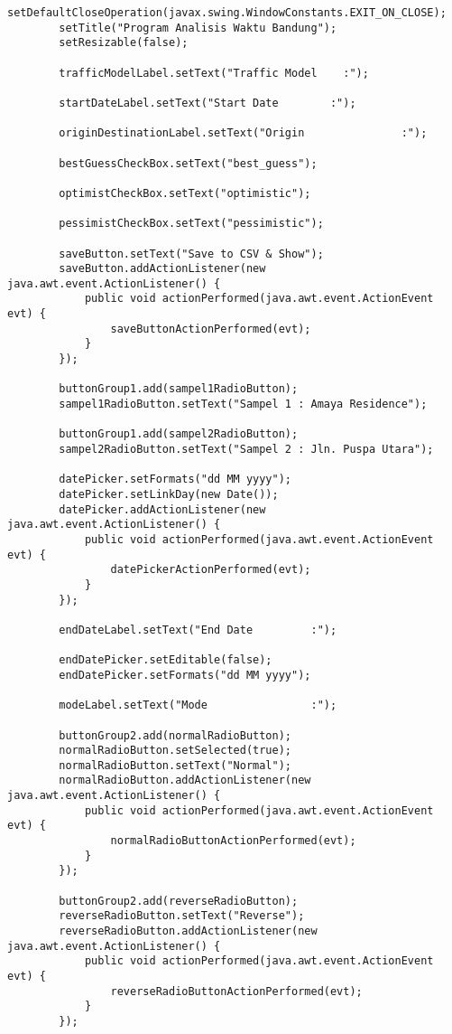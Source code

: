 \begin{lstlisting}[caption= main.java]
        setDefaultCloseOperation(javax.swing.WindowConstants.EXIT_ON_CLOSE);
        setTitle("Program Analisis Waktu Bandung");
        setResizable(false);

        trafficModelLabel.setText("Traffic Model    :");

        startDateLabel.setText("Start Date        :");

        originDestinationLabel.setText("Origin               :");

        bestGuessCheckBox.setText("best_guess");

        optimistCheckBox.setText("optimistic");

        pessimistCheckBox.setText("pessimistic");

        saveButton.setText("Save to CSV & Show");
        saveButton.addActionListener(new java.awt.event.ActionListener() {
            public void actionPerformed(java.awt.event.ActionEvent evt) {
                saveButtonActionPerformed(evt);
            }
        });

        buttonGroup1.add(sampel1RadioButton);
        sampel1RadioButton.setText("Sampel 1 : Amaya Residence");

        buttonGroup1.add(sampel2RadioButton);
        sampel2RadioButton.setText("Sampel 2 : Jln. Puspa Utara");

        datePicker.setFormats("dd MM yyyy");
        datePicker.setLinkDay(new Date());
        datePicker.addActionListener(new java.awt.event.ActionListener() {
            public void actionPerformed(java.awt.event.ActionEvent evt) {
                datePickerActionPerformed(evt);
            }
        });

        endDateLabel.setText("End Date         :");

        endDatePicker.setEditable(false);
        endDatePicker.setFormats("dd MM yyyy");

        modeLabel.setText("Mode                :");

        buttonGroup2.add(normalRadioButton);
        normalRadioButton.setSelected(true);
        normalRadioButton.setText("Normal");
        normalRadioButton.addActionListener(new java.awt.event.ActionListener() {
            public void actionPerformed(java.awt.event.ActionEvent evt) {
                normalRadioButtonActionPerformed(evt);
            }
        });

        buttonGroup2.add(reverseRadioButton);
        reverseRadioButton.setText("Reverse");
        reverseRadioButton.addActionListener(new java.awt.event.ActionListener() {
            public void actionPerformed(java.awt.event.ActionEvent evt) {
                reverseRadioButtonActionPerformed(evt);
            }
        });


\end{lstlisting}
